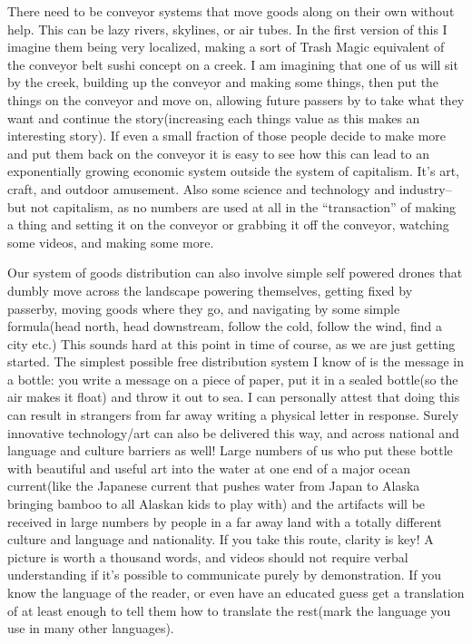 There need to be conveyor systems that move goods along on their own
without help. This can be lazy rivers, skylines, or air tubes. In the
first version of this I imagine them being very localized, making a sort
of Trash Magic equivalent of the conveyor belt sushi concept on a creek.
I am imagining that one of us will sit by the creek, building up the
conveyor and making some things, then put the things on the conveyor and
move on, allowing future passers by to take what they want and continue
the story(increasing each things value as this makes an interesting
story). If even a small fraction of those people decide to make more and
put them back on the conveyor it is easy to see how this can lead to an
exponentially growing economic system outside the system of capitalism.
It's art, craft, and outdoor amusement. Also some science and technology
and industry--but not capitalism, as no numbers are used at all in the
``transaction'' of making a thing and setting it on the conveyor or
grabbing it off the conveyor, watching some videos, and making some
more.

Our system of goods distribution can also involve simple self powered
drones that dumbly move across the landscape powering themselves,
getting fixed by passerby, moving goods where they go, and navigating by
some simple formula(head north, head downstream, follow the cold, follow
the wind, find a city etc.) This sounds hard at this point in time of
course, as we are just getting started. The simplest possible free
distribution system I know of is the message in a bottle: you write a
message on a piece of paper, put it in a sealed bottle(so the air makes
it float) and throw it out to sea. I can personally attest that doing
this can result in strangers from far away writing a physical letter in
response. Surely innovative technology/art can also be delivered this
way, and across national and language and culture barriers as well!
Large numbers of us who put these bottle with beautiful and useful art
into the water at one end of a major ocean current(like the Japanese
current that pushes water from Japan to Alaska bringing bamboo to all
Alaskan kids to play with) and the artifacts will be received in large
numbers by people in a far away land with a totally different culture
and language and nationality. If you take this route, clarity is key! A
picture is worth a thousand words, and videos should not require verbal
understanding if it's possible to communicate purely by demonstration.
If you know the language of the reader, or even have an educated guess
get a translation of at least enough to tell them how to translate the
rest(mark the language you use in many other languages).

